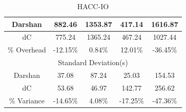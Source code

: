 \begin{table}[h]
\begin{subtable}[h]{0.5\textwidth}
\begin{tabular}{|ccccc|}
        \multicolumn{1}{|c|}{Darshan}         & \multicolumn{1}{c|}{882.46}   & \multicolumn{1}{c|}{1353.87}  & \multicolumn{1}{c|}{417.14}   & 1616.87  \\ \hline
        \multicolumn{1}{|c|}{dC}              & \multicolumn{1}{c|}{775.24}   & \multicolumn{1}{c|}{1365.24}  & \multicolumn{1}{c|}{467.24}   & 1027.44  \\ \hline
        \multicolumn{1}{|c|}{\% Overhead}     & \multicolumn{1}{c|}{-12.15\%} & \multicolumn{1}{c|}{0.84\%}   & \multicolumn{1}{c|}{12.01\%}  & -36.45\% \\ \hline
        \multicolumn{5}{|c|}{Standard Deviation(s)}                                                                                                         \\ \hline
        \multicolumn{1}{|c|}{Darshan}         & \multicolumn{1}{c|}{37.08}    & \multicolumn{1}{c|}{87.24}    & \multicolumn{1}{c|}{25.03}    & 154.53   \\ \hline
        \multicolumn{1}{|c|}{dC}              & \multicolumn{1}{c|}{53.68}    & \multicolumn{1}{c|}{46.97}    & \multicolumn{1}{c|}{142.77}   & 256.62   \\ \hline
        \multicolumn{1}{|c|}{\% Variance}     & \multicolumn{1}{c|}{-14.65\%} & \multicolumn{1}{c|}{4.08\%}   & \multicolumn{1}{c|}{-17.25\%} & -47.36\% \\ \hline
        \end{tabular}
    \caption{HACC-IO} 
    \label{subtable:HACC}
    \vspace{0.5cm}
    \end{subtable}

\end{table}
